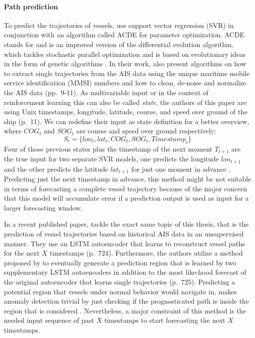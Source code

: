 \paragraph{Path prediction}
To predict the trajectories of vessels, \cite{liu2019vessel} use support vector regression (SVR) in conjunction with an algorithm called ACDE for  parameter optimization. ACDE stands for  and is an improved version of the differential evolution algorithm, which tackles stochastic parallel optimization and is based on evolutionary ideas in the form of genetic algorithms \cite[pp.~1-3]{thangaraj2009simple}. In their work, \cite{liu2019vessel} also present algorithms on how to extract single trajectories from the AIS data using the unique maritime mobile service identification (MMSI) numbers and how to clean, de-noise and normalize the AIS data (pp.~9-11). As multivariable input or in the context of reinforcement learning this can also be called \textit{state}, the authors of this paper are using Unix timestamps, longitude, latitude, course, and speed over ground of the ship (p.~11). We can redefine their input as state definition for a better overview, where $COG_t$ and $SOG_t$ are course and speed over ground respectively:
\begin{equation}
S_t = \{lon_t, lat_t, COG_t, SOG_t, Timestamp_t\}
\end{equation}
Four of those previous states plus the timestamp of the next moment $T_{t+1}$ are the true input for two separate SVR models, one predicts the longitude $lon_{t+1}$ and the other predicts the latitude $lat_{t+1}$ for just one moment in advance \cite[p.~11]{liu2019vessel}. Predicting just the next timestamp in advance, this method might be not suitable in terms of forecasting a complete vessel trajectory because of the major concern that this model will accumulate error if a prediction output is used as input for a larger forecasting window.
\par
In a recent published paper, \cite{venskus2021unsupervised} tackle the exact same topic of this thesis, that is the prediction of vessel trajectories based on historical AIS data in an unsupervised manner. They use an LSTM autoencoder that learns to reconstruct vessel paths for the next $X$ timestamps (p.~724). Furthermore, the authors utilize a method proposed by \cite{cruz2019} to eventually generate a prediction region that is learned by two supplementary LSTM autoencoders in addition to the  most like-hood forecast of the original autoencoder that learns single trajectories (p.~725). Predicting a potential region that vessels under normal behavior would navigate in, makes anomaly detection trivial by just checking if the prognosticated path is inside the region that is considered . Nevertheless, a major constraint of this method is the needed input sequence of past $X$ timestamps to start forecasting the next $X$ timestamps.
